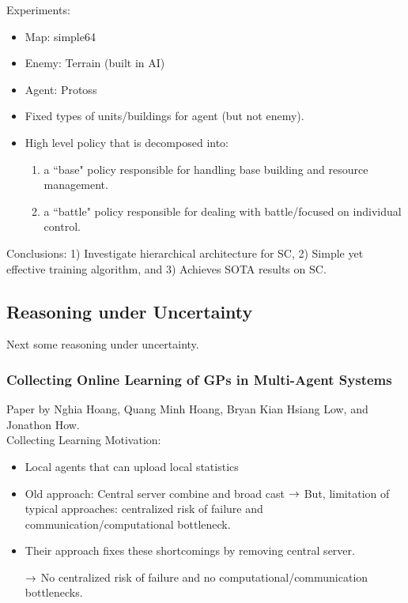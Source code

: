 Experiments:
\begin{itemize}
    \item Map: simple64
    \item Enemy: Terrain (built in AI)
    \item Agent: Protoss
    \item Fixed types of units/buildings for agent (but not enemy).
    \item High level policy that is decomposed into:
    \begin{enumerate}
        \item a ``base" policy responsible for handling base building and resource management.
        \item a ``battle" policy responsible for dealing with battle/focused on individual control.
    \end{enumerate}
\end{itemize}

Conclusions: 1) Investigate hierarchical architecture for SC, 2) Simple yet effective training algorithm, and 3) Achieves SOTA results on SC. \\


\spacerule

\subsection{Reasoning under Uncertainty}

Next some reasoning under uncertainty.

\subsubsection{Collecting Online Learning of GPs in Multi-Agent Systems}

Paper by Nghia Hoang, Quang Minh Hoang, Bryan Kian Hsiang Low, and Jonathon How. \\

Collecting Learning Motivation:
\begin{itemize}
    \item Local agents that can upload local statistics
    \item Old approach: Central server combine and broad cast
    $\rightarrow$ But, limitation of typical approaches: centralized risk of failure and communication/computational bottleneck.
    
    \item Their approach fixes these shortcomings by removing central server. 
    
    $\rightarrow$ No centralized risk of failure and no computational/communication bottlenecks.
\end{itemize}

